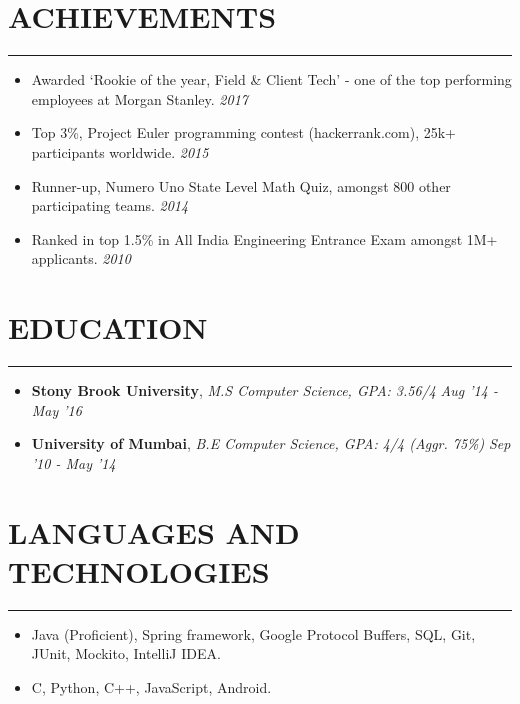 \documentclass[12pt]{article}
\newcommand{\sectionHeading}[1]{
\vspace{-15pt}
\section*{\small{#1}}
\vspace{-10pt}
\hrule
\vspace{8pt}
}
\newcommand {\extracurricularSectionSubheading}[3]{
    \noindent \small{\textbf{#1} : #2 \hfill \textit{#3}} \\
    \vspace{-10pt}
}
\newcommand{\sectionListStart}{
    \begin{itemize}[label={\small{\textbullet}}, leftmargin=20pt] %
}
\newcommand{\sectionListStartNoBullet}{
    \begin{itemize}[label={}, leftmargin=0pt] %
}
\newcommand{\sectionListEnd}{\end{itemize} \vspace{0pt}}
\newcommand{\sectionListItem}[1]{\item \small{#1}}
\newcommand{\sectionListItemWithDate}[2]{\item \small{#1 \hfill \textit{#2}}}
\newcommand{\eduListItemWithDate}[3]{\item \small{\textbf{#1}, \textit{#2} \hfill \textit{#3}} \vspace{5pt}}
\begin{document}



\sectionHeading{ACHIEVEMENTS}
\sectionListStart
    \sectionListItemWithDate
        {Awarded `Rookie of the year, Field \& Client Tech' - one of the top performing employees at Morgan Stanley.}{2017}
    \sectionListItemWithDate
        {Top 3\%, Project Euler programming contest (hackerrank.com), 25k+ participants worldwide.}{2015}
    \sectionListItemWithDate
        {Runner-up, Numero Uno State Level Math Quiz, amongst 800 other participating teams.}{2014}
    \sectionListItemWithDate
        {Ranked in top 1.5\% in All India Engineering Entrance Exam amongst 1M+ applicants.}{2010}
\sectionListEnd


\sectionHeading{EDUCATION}
\sectionListStartNoBullet
\eduListItemWithDate
{Stony Brook  University}{M.S Computer Science, GPA: 3.56/4}{Aug '14 - May '16}

\eduListItemWithDate
{University of Mumbai}{B.E Computer Science, GPA: 4/4 (Aggr. 75\%)}{Sep '10 - May '14}
\sectionListEnd
\sectionHeading{LANGUAGES AND TECHNOLOGIES}
\sectionListStart
    \sectionListItem
        Java (Proficient), Spring framework, Google Protocol Buffers, SQL, Git, JUnit, Mockito, IntelliJ IDEA.
    \sectionListItem
        C, Python, C++, JavaScript, Android. 
\sectionListEnd

\end{document}
